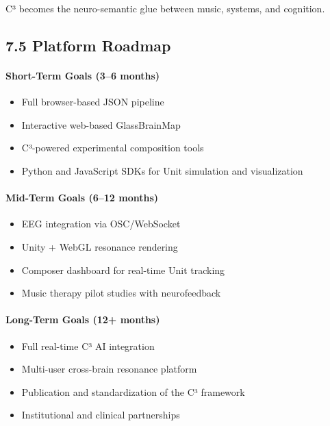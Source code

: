 \documentclass[10pt]{article}
\begin{document}
C³ becomes the neuro-semantic glue between music, systems, and cognition.

\subsection*{7.5 Platform Roadmap}

\paragraph{Short-Term Goals (3–6 months)}

\begin{itemize}
    \item Full browser-based JSON pipeline
    \item Interactive web-based GlassBrainMap
    \item C³-powered experimental composition tools
    \item Python and JavaScript SDKs for Unit simulation and visualization
\end{itemize}

\paragraph{Mid-Term Goals (6–12 months)}

\begin{itemize}
    \item EEG integration via OSC/WebSocket
    \item Unity + WebGL resonance rendering
    \item Composer dashboard for real-time Unit tracking
    \item Music therapy pilot studies with neurofeedback
\end{itemize}

\paragraph{Long-Term Goals (12+ months)}

\begin{itemize}
    \item Full real-time C³ AI integration
    \item Multi-user cross-brain resonance platform
    \item Publication and standardization of the C³ framework
    \item Institutional and clinical partnerships
\end{itemize}
\end{document}
